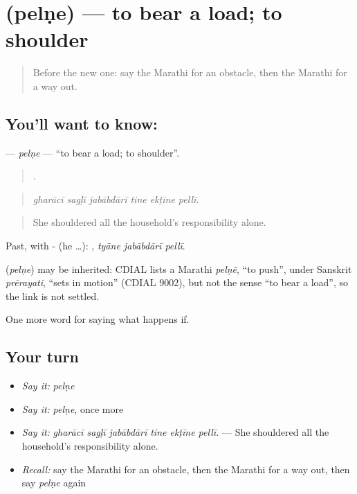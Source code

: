 \section[\texorpdfstring{\mr{पेलणे} (pelṇe)}{पेलणे (pelṇe)}]{ (pelṇe) — to bear a load; to shoulder}

\label{lesson:MR-C548-pelne}



\begin{quote}
Before the new one: say the Marathi for an obstacle, then the Marathi for a way out.
\end{quote}

\subsection*{You'll want to know: }
\textbf{} — \emph{pelṇe} — \textquotedblleft{}to bear a load; to shoulder\textquotedblright{}.

\begin{quote}
     .
\end{quote}

\begin{quote}
\emph{gharācī sagḷī jabābdārī tine ekṭīne pellī.}
\end{quote}

\begin{quote}
She shouldered all the household's responsibility alone.
\end{quote}

Past, with - (he …):   , \emph{tyāne jabābdārī pellī}.

\begin{cousinweb}
\textbf{} (\emph{pelṇe}) may be inherited: CDIAL lists a Marathi \emph{pelṇẽ}, \textquotedblleft{}to push\textquotedblright{}, under Sanskrit \emph{prērayati}, \textquotedblleft{}sets in motion\textquotedblright{} (CDIAL 9002), but not the sense \textquotedblleft{}to bear a load\textquotedblright{}, so the link is not settled.
\end{cousinweb}

\begin{grammarlens}[title={What you've built}]
One more word for saying what happens if.
\end{grammarlens}

\subsection*{Your turn}
\begin{itemize}
\raggedright
  \item \emph{Say it:} \emph{pelṇe}
  \item \emph{Say it:} \emph{pelṇe}, once more
  \item \emph{Say it:} \emph{gharācī sagḷī jabābdārī tine ekṭīne pellī.} — She shouldered all the household's responsibility alone.
  \item \emph{Recall:} say the Marathi for an obstacle, then the Marathi for a way out, then say \emph{pelṇe} again
\end{itemize}

